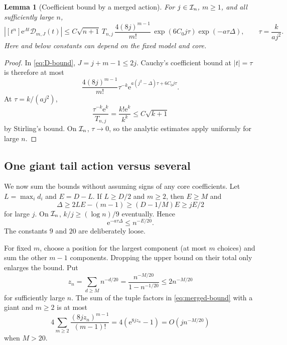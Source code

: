 \documentclass[11pt,a4paper]{article}
\numberwithin{equation}{section}
\newtheorem{lemma}[theorem]{Lemma}
\theoremstyle{definition}
\theoremstyle{remark}\newtheorem{remark}[theorem]{Remark}
\newcommand{\ee}{\mathrm e}\newcommand{\dd}{\mathrm d}
\begin{document}
\begin{lemma}[Coefficient bound by a merged action]
\label{lem:merged}
For $j\in\mathcal I_n$, $m\ge1$, and all sufficiently large $n$,
\begin{equation}
 \left|[t^n]\ee^{\Lambda t}\mathcal D_{m,J}(t)\right|
 \le C\sqrt{n+1}\,T_{n,j}\,
 \frac{4(8j)^{m-1}}{m!}\,
 \exp(6C_0j\tau)\exp(-a\tau\Delta),
 \qquad \tau=\frac{k}{aj^2}.
 \label{eq:merged-bound}
\end{equation}
Here and below constants can depend on the fixed model and core.
\end{lemma}
\begin{proof}
In \eqref{eq:D-bound}, $J=j+m-1\le2j$. Cauchy's coefficient bound at
$|t|=\tau$ is therefore at most
\[
 \frac{4(8j)^{m-1}}{m!}\tau^{-k}
 \ee^{a(j^2-\Delta)\tau+6C_0j\tau}.
\]
At $\tau=k/(aj^2)$,
\[
 \frac{\tau^{-k}\ee^k}{T_{n,j}}=
 \frac{k!\ee^k}{k^k}\le C\sqrt{k+1}
\]
by Stirling's bound. On $\mathcal I_n$, $\tau\to0$, so the analytic estimates
apply uniformly for large $n$.
\end{proof}

\subsection{One giant tail action versus several}
We now sum the bounds without assuming signs of any core coefficients.
Let $L=\max_i d_i$ and $E=D-L$.
If $L\ge D/2$ and $m\ge2$, then $E\ge M$ and
\begin{equation}
 \Delta\ge2LE-(m-1)\ge(D-1/M)E\ge jE/2
 \label{eq:giantdefect}
\end{equation}
for large $j$. On $\mathcal I_n$, $k/j\ge(\log n)/9$ eventually. Hence
\begin{equation}
 \ee^{-a\tau\Delta}\le n^{-E/20}.
 \label{eq:powertail}
\end{equation}
The constants $9$ and $20$ are deliberately loose.

For fixed $m$, choose a position for the largest component (at most $m$
choices) and sum the other $m-1$ components. Dropping the upper bound on
their total only enlarges the bound. Put
\[
 z_n=\sum_{d\ge M}n^{-d/20}
 =\frac{n^{-M/20}}{1-n^{-1/20}}\le2n^{-M/20}
\]
for sufficiently large $n$. The sum of the tuple factors in
\eqref{eq:merged-bound} with a giant and $m\ge2$ is at most
\begin{equation}
 4\sum_{m\ge2}\frac{(8jz_n)^{m-1}}{(m-1)!}
 =4(\ee^{8jz_n}-1)=O(jn^{-M/20})
 \label{eq:giantsum}
\end{equation}
when $M>20$.
\end{document}
